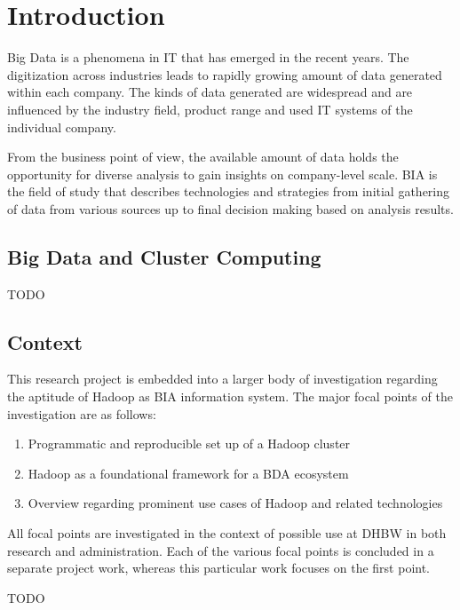 \chapter{Introduction}
\label{chap:intro}

Big Data is a phenomena in \ac{IT} that has emerged in the recent years.
The digitization across industries leads to rapidly growing amount of data generated
within each company.
The kinds of data generated are widespread 
and are influenced by the industry field, product range and used \ac{IT} systems 
of the individual company.

From the business point of view, the available amount of data 
holds the opportunity for diverse analysis to gain insights on company-level scale.
\ac{BIA} is the field of study that describes technologies and strategies 
from initial gathering of data from various sources 
up to final decision making based on analysis results.    

\section{Big Data and Cluster Computing}
\label{sec:intro:cluster}

TODO

\section{Context}
\label{sec:intro:context}

This research project is embedded into a larger body of investigation regarding the aptitude of Hadoop as \acs{BIA} information system. The major focal points of the investigation are as follows:

\begin{enumerate}
	\item Programmatic and reproducible set up of a Hadoop cluster
	\item Hadoop as a foundational framework for a \acl{BDA} ecosystem
	\item Overview regarding prominent use cases of Hadoop and related technologies
\end{enumerate}

All focal points are investigated in the context of possible use at \acf{DHBW} in both research and administration. Each of the various focal points is concluded in a separate project work, whereas this particular work focuses on the first point.


TODO

